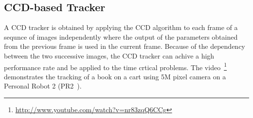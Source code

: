 \documentclass[conference]{IEEEtran}
\begin{document}
\subsection{CCD-based Tracker}
A CCD tracker is obtained by applying the CCD algorithm to each
frame of  a sequnce of images independently where the output of the parameters 
obtained from the previous frame is used in the current frame. Because  of the 
dependency between the two successive images, the CCD tracker can achive a high
performance rate and be applied to the time crtical problems. The 
video~\footnote{\url{http://www.youtube.com/watch?v=nr83zqQ6CCg}} demonstrates the tracking of
a book on a cart using 5M pixel camera on a Personal Robot 2 (PR2~\cite{Wyrobek08PR1}).
\end{document}
